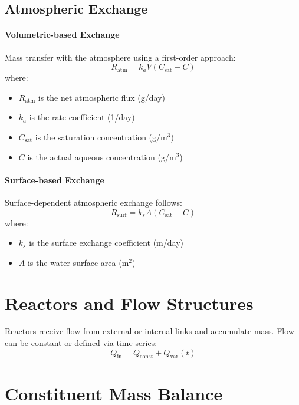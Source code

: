 \documentclass[12pt]{report}
\begin{document}
\subsection*{Atmospheric Exchange}

\paragraph{Volumetric-based Exchange}
Mass transfer with the atmosphere using a first-order approach:
\begin{equation}
R_{\text{atm}} = k_a V (C_{\text{sat}} - C)
\end{equation}
where:
\begin{itemize}
  \item $R_{\text{atm}}$ is the net atmospheric flux (g/day)
  \item $k_a$ is the rate coefficient (1/day)
  \item $C_{\text{sat}}$ is the saturation concentration (g/m$^3$)
  \item $C$ is the actual aqueous concentration (g/m$^3$)
\end{itemize}

\paragraph{Surface-based Exchange}
Surface-dependent atmospheric exchange follows:
\begin{equation}
R_{\text{surf}} = k_s A (C_{\text{sat}} - C)
\end{equation}
where:
\begin{itemize}
  \item $k_s$ is the surface exchange coefficient (m/day)
  \item $A$ is the water surface area (m$^2$)
\end{itemize}

\section{Reactors and Flow Structures}

Reactors receive flow from external or internal links and accumulate mass. Flow can be constant or defined via time series:
\begin{equation}
Q_{\text{in}} = Q_{\text{const}} + Q_{\text{var}}(t)
\end{equation}

\section{Constituent Mass Balance}
\end{document}

